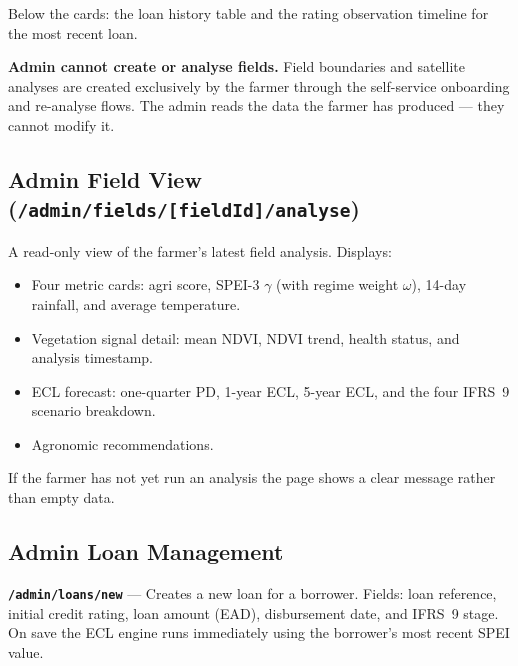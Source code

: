 \documentclass[12pt,a4paper]{article}
\begin{document}
Below the cards: the loan history table and the rating observation timeline for
the most recent loan.

\begin{infobox}
  \textbf{Admin cannot create or analyse fields.}  Field boundaries and
  satellite analyses are created exclusively by the farmer through the
  self-service onboarding and re-analyse flows.  The admin reads the data the
  farmer has produced --- they cannot modify it.
\end{infobox}

\subsection{Admin Field View (\texttt{/admin/fields/[fieldId]/analyse})}

A read-only view of the farmer's latest field analysis.  Displays:

\begin{itemize}[leftmargin=1.5em]
  \item Four metric cards: agri score, SPEI-3 $\gamma$ (with regime weight
        $\omega$), 14-day rainfall, and average temperature.
  \item Vegetation signal detail: mean NDVI, NDVI trend, health status, and
        analysis timestamp.
  \item ECL forecast: one-quarter PD, 1-year ECL, 5-year ECL, and the four
        IFRS~9 scenario breakdown.
  \item Agronomic recommendations.
\end{itemize}

If the farmer has not yet run an analysis the page shows a clear message
rather than empty data.

\subsection{Admin Loan Management}

\textbf{\texttt{/admin/loans/new}} --- Creates a new loan for a borrower.
Fields: loan reference, initial credit rating, loan amount (EAD), disbursement
date, and IFRS~9 stage.  On save the ECL engine runs immediately using the
borrower's most recent SPEI value.
\end{document}
